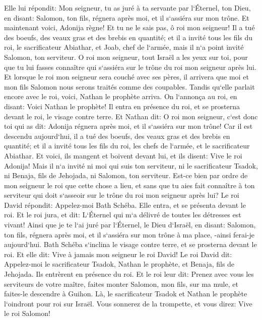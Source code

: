 \verse Elle lui répondit: Mon seigneur, tu as juré à ta servante par l`Éternel, ton Dieu, en disant: Salomon, ton fils, régnera après moi, et il s`assiéra sur mon trône. 
\verse Et maintenant voici, Adonija règne! Et tu ne le sais pas, ô roi mon seigneur! 
\verse Il a tué des boeufs, des veaux gras et des brebis en quantité; et il a invité tous les fils du roi, le sacrificateur Abiathar, et Joab, chef de l`armée, mais il n`a point invité Salomon, ton serviteur. 
\verse O roi mon seigneur, tout Israël a les yeux sur toi, pour que tu lui fasses connaître qui s`assiéra sur le trône du roi mon seigneur après lui. 
\verse Et lorsque le roi mon seigneur sera couché avec ses pères, il arrivera que moi et mon fils Salomon nous serons traités comme des coupables. 
\verse Tandis qu`elle parlait encore avec le roi, voici, Nathan le prophète arriva. 
\verse On l`annonça au roi, en disant: Voici Nathan le prophète! Il entra en présence du roi, et se prosterna devant le roi, le visage contre terre. 
\verse Et Nathan dit: O roi mon seigneur, c`est donc toi qui as dit: Adonija régnera après moi, et il s`assiéra sur mon trône! 
\verse Car il est descendu aujourd`hui, il a tué des boeufs, des veaux gras et des brebis en quantité; et il a invité tous les fils du roi, les chefs de l`armée, et le sacrificateur Abiathar. Et voici, ils mangent et boivent devant lui, et ils disent: Vive le roi Adonija! 
\verse Mais il n`a invité ni moi qui suis ton serviteur, ni le sacrificateur Tsadok, ni Benaja, fils de Jehojada, ni Salomon, ton serviteur. 
\verse Est-ce bien par ordre de mon seigneur le roi que cette chose a lieu, et sans que tu aies fait connaître à ton serviteur qui doit s`asseoir sur le trône du roi mon seigneur après lui? 
\verse Le roi David répondit: Appelez-moi Bath Schéba. Elle entra, et se présenta devant le roi. 
\verse Et le roi jura, et dit: L`Éternel qui m`a délivré de toutes les détresses est vivant! 
\verse Ainsi que je te l`ai juré par l`Éternel, le Dieu d`Israël, en disant: Salomon, ton fils, régnera après moi, et il s`assiéra sur mon trône à ma place, -ainsi ferai-je aujourd`hui. 
\verse Bath Schéba s`inclina le visage contre terre, et se prosterna devant le roi. Et elle dit: Vive à jamais mon seigneur le roi David! 
\verse Le roi David dit: Appelez-moi le sacrificateur Tsadok, Nathan le prophète, et Benaja, fils de Jehojada. Ils entrèrent en présence du roi. 
\verse Et le roi leur dit: Prenez avec vous les serviteurs de votre maître, faites monter Salomon, mon fils, sur ma mule, et faites-le descendre à Guihon. 
\verse Là, le sacrificateur Tsadok et Nathan le prophète l`oindront pour roi sur Israël. Vous sonnerez de la trompette, et vous direz: Vive le roi Salomon! 
